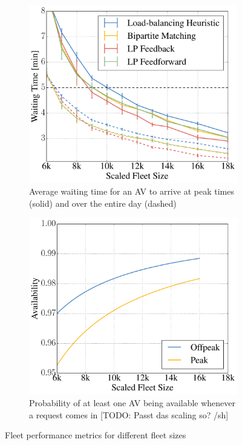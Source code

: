 \begin{figure}
    \centering
    \begin{subfigure}[t]{0.495\textwidth}
        \includegraphics[width=1.0\textwidth]{figures/mean_peak_waiting_times.pdf}
        \caption{Average waiting time for an AV to arrive at peak times (solid) and over the entire day (dashed)}
        \label{fig:mean_peak_waiting_times}
    \end{subfigure}\hfill
    \begin{subfigure}[t]{0.495\textwidth}
        \includegraphics[width=1.0\textwidth]{figures/availability.pdf}
        \caption{Probability of at least one AV being available whenever a request comes in
        [TODO: Passt das scaling so? /sh]}
        \label{fig:performanceavailability}
    \end{subfigure}
    \caption{Fleet performance metrics for different fleet sizes}
\end{figure}







